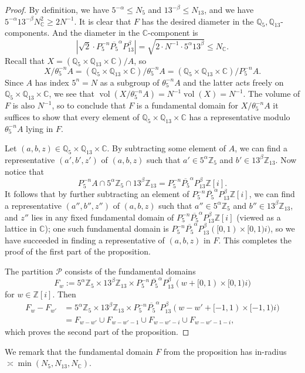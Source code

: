 \documentclass[11pt]{amsart}
\theoremstyle{definition}
\DeclareMathOperator{\vol}{vol}
\newcommand{\C}{{\mathbb C}}
\begin{document}
\begin{proof}
By definition, we have $5^{-\alpha} \leq N_5$ and $13^{-\beta} \leq N_{13}$, and we have $5^{-\alpha}13^{-\beta}N_{\mathbb{C}}^2 \geq 2N^{-1}$.  It is clear that $F$ has the desired diameter in the $\mathbb{Q}_5,\mathbb{Q}_{13}$-components.  And the diameter in the $\mathbb{C}$-component is
$$|\sqrt{2} \cdot P_5^{-n}\overline{P_5}^\alpha P_{13}^\beta|=\sqrt{2 \cdot N^{-1} \cdot 5^\alpha 13^\beta} \leq N_\mathbb{C}.$$
Recall that $X=(\mathbb{Q}_5 \times \mathbb{Q}_{13} \times \mathbb{C})/A$, so $$X/\theta_5^{-n}A=(\mathbb{Q}_5 \times \mathbb{Q}_{13} \times \mathbb{C})/\theta_5^{-n}A=(\mathbb{Q}_5 \times \mathbb{Q}_{13} \times \mathbb{C})/P_5^{-n}A.$$
Since $A$ has index $5^n=N$ as a subgroup of $\theta_5^{-n}A$ and the latter acts freely on $\mathbb{Q}_5 \times \mathbb{Q}_{13} \times \mathbb{C}$, we see that $\vol(X/\theta_5^{-n}A)=N^{-1}\vol(X)=N^{-1}$.  The volume of $F$ is also $N^{-1}$, so to conclude that $F$ is a fundamental domain for $X/\theta_5^{-n}A$ it suffices to show that every element of $\mathbb{Q}_5 \times \mathbb{Q}_{13} \times \mathbb{C}$ has a representative modulo $\theta_5^{-n}A$ lying in $F$.

Let $(a,b,z) \in \mathbb{Q}_5 \times \mathbb{Q}_{13} \times \mathbb{C}$.  By subtracting some element of $A$, we can find a representative $(a',b',z')$ of $(a,b,z)$ such that $a' \in 5^{\alpha}\mathbb{Z}_5$ and $b' \in 13^{\beta} \mathbb{Z}_{13}$.  Now notice that
$$P_5^{-n}A \cap 5^\alpha \mathbb{Z}_5 \cap 13^\beta \mathbb{Z}_{13}=P_5^{-n}\overline{P_5}^\alpha P_{13}^\beta \mathbb{Z}[i].$$
It follows that by further subtracting an element of $P_5^{-n}\overline{P_5}^\alpha P_{13}^\beta \mathbb{Z}[i]$, we can find a representative $(a'',b'',z'')$ of $(a,b,z)$ such that $a'' \in 5^{\alpha}\mathbb{Z}_5$ and $b'' \in 13^{\beta} \mathbb{Z}_{13}$, and $z''$ lies in any fixed fundamental domain of $P_5^{-n}\overline{P_5}^\alpha P_{13}^\beta \mathbb{Z}[i]$ (viewed as a lattice in $\mathbb{C}$); one such fundamental domain is $P_5^{-n}\overline{P_5}^\alpha P_{13}^\beta ([0,1) \times [0,1)i)$, so we have succeeded in finding a representative of $(a,b,z)$ in $F$.  This completes the proof of the first part of the proposition.

The partition $\mathcal{P}$ consists of the fundamental domains
$$F_w:=5^\alpha \mathbb{Z}_5 \times 13^\beta \mathbb{Z}_{13} \times P_5^{-n}\overline{P_5}^\alpha P_{13}^\beta (w+[0,1) \times [0,1)i)$$
for $w \in \mathbb{Z}[i]$.  Then
\begin{align*}
F_w-F_{w'} &=5^\alpha \mathbb{Z}_5 \times 13^\beta \mathbb{Z}_{13} \times  P_5^{-n}\overline{P_5}^\alpha P_{13}^\beta (w-w'+[-1,1) \times [-1,1)i)\\
 &=F_{w-w'} \cup F_{w-w'-1} \cup F_{w-w'-i} \cup F_{w-w'-1-i},
\end{align*}
which proves the second part of the proposition.
\end{proof}
We remark that the fundamental domain $F$ from the proposition has in-radius $\asymp \min(N_5,N_{13},N_{\C})$.
\end{document}
